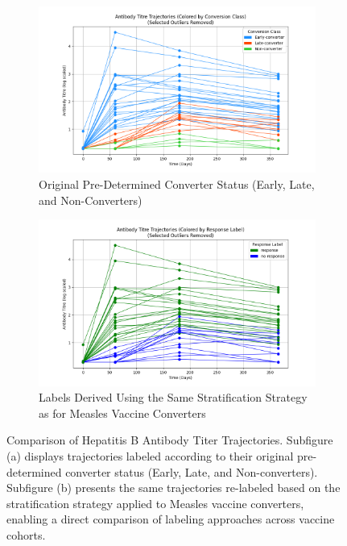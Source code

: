 \documentclass[12pt,a4paper]{report}
\begin{document}
\begin{figure}[h!]
    \centering

    \begin{subfigure}[b]{0.49\textwidth}
        \centering
        \includegraphics[width=\textwidth]{images/Antibody_Titer_Trajectories_for_Hepatitis_original.png}
        \caption{Original Pre-Determined Converter Status (Early, Late, and Non-Converters)}
        \label{fig:antibody_titer_hepatitis_original}
    \end{subfigure}
    \hfill
    \begin{subfigure}[b]{0.49\textwidth}
        \centering
        \includegraphics[width=\linewidth]{images/Antibody_Titer_Trajectories_for_Hepatitis.png}
        \caption{Labels Derived Using the Same Stratification Strategy as for Measles Vaccine Converters}
        \label{fig:antibody_titer_hepatitis}
    \end{subfigure}

    \caption[Hepatitis B Antibody Titer Trajectories]{Comparison of Hepatitis B Antibody Titer Trajectories. Subfigure (a) displays trajectories labeled according to their original pre-determined converter status (Early, Late, and Non-converters). Subfigure (b) presents the same trajectories re-labeled based on the stratification strategy applied to Measles vaccine converters, enabling a direct comparison of labeling approaches across vaccine cohorts.}
    \label{fig:antibody_titer_hepatitis_all}
\end{figure}
\end{document}
